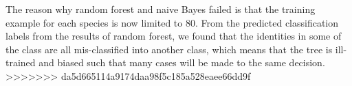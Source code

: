 \documentclass[12pt,peerreview,letterpaper]{IEEEtran}
\begin{document}
The reason why random forest and naive Bayes failed is that the training example for each species is now limited to 80. From the predicted classification labels from the results of random forest, we found that the identities in some of the class are all mis-classified into another class, which means that the tree is ill-trained and biased such that many cases will be made to the same decision.
>>>>>>> da5d665114a9174daa98f5c185a528eaee66dd9f



\end{document}

